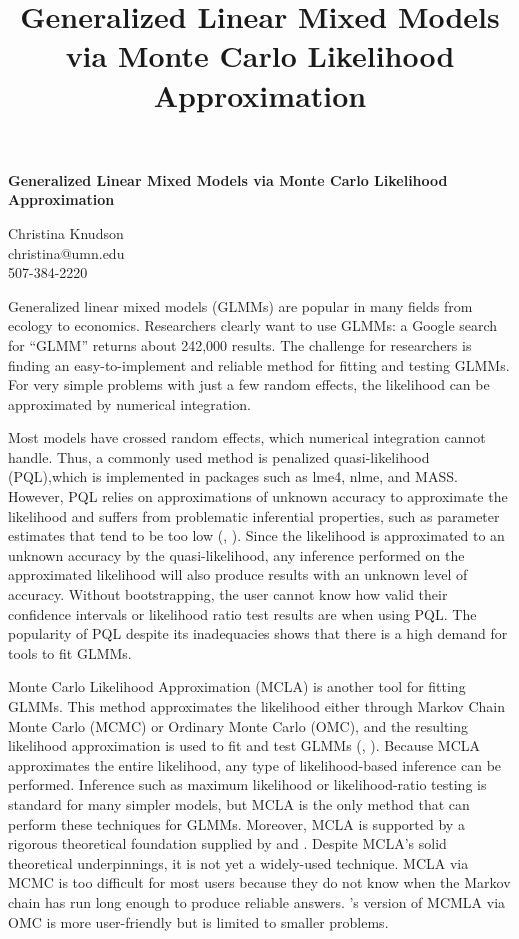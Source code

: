 \documentclass[12pt]{article}
\title{Generalized Linear Mixed Models via Monte Carlo Likelihood Approximation}
\author{}
\date{}
\newcommand{\pcite}[1]{\citeauthor{#1}'s \citeyearpar{#1}}
\newcommand{\ncite}[1]{\citeauthor{#1}, \citeyear{#1}}
\begin{document}
 \centerline{\large \bf Generalized Linear Mixed Models via Monte Carlo Likelihood Approximation} %

 \medskip

 \centerline{Christina Knudson\\
christina@umn.edu\\
507-384-2220}
 \smallskip
{}

Generalized linear mixed models (GLMMs) are popular in many fields from ecology to economics. Researchers clearly want to use GLMMs: a Google search for ``GLMM'' returns about 242,000 results.  The challenge for researchers is finding an easy-to-implement and reliable method for fitting and testing GLMMs. For very simple problems with just a few random effects, the likelihood can be approximated by numerical integration.  

Most models have crossed random effects, which numerical integration cannot handle. Thus, a commonly used method is penalized quasi-likelihood (PQL),which is  implemented in packages such as lme4, nlme, and MASS. However, PQL relies on approximations of unknown accuracy to approximate the likelihood and suffers from problematic inferential properties, such as parameter estimates that tend to be too low (\ncite{mccu:sear:2001}). Since the likelihood is approximated to an unknown accuracy by the quasi-likelihood, any inference performed on the approximated likelihood will also produce results with an unknown level of accuracy.  Without bootstrapping, the user cannot know how valid their confidence intervals or likelihood ratio test results are when using PQL.  The popularity of PQL despite its inadequacies shows that there is a high demand for tools to fit GLMMs.


Monte Carlo  Likelihood Approximation (MCLA) is another tool for fitting GLMMs. This method approximates the likelihood either through Markov Chain Monte Carlo (MCMC) or Ordinary Monte Carlo (OMC), and the resulting likelihood approximation is used to fit and test GLMMs (\ncite{geyer:thom:1992}).   Because MCLA approximates the entire likelihood, any type of likelihood-based inference can be performed.  Inference such as maximum likelihood or likelihood-ratio testing is standard for many simpler models, but MCLA is the only method that can perform these techniques for GLMMs.  Moreover, MCLA is supported by a rigorous theoretical foundation supplied by \citet{geyer:1994} and  \citet{sung:geyer:2007}. Despite MCLA's solid theoretical underpinnings, it is not yet a widely-used technique. MCLA via MCMC is  too difficult for most users because they do not know when the Markov chain has run long enough to produce reliable answers.  \pcite{sung:geyer:2007} version of MCMLA via OMC is more user-friendly but is limited to smaller problems.
\end{document}
